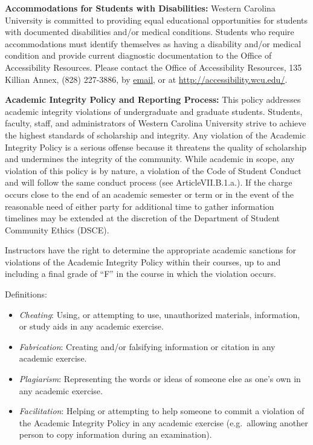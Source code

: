 \documentclass[]{tufte-book}
\providecommand{\tightlist}{%
  \setlength{\itemsep}{0pt}\setlength{\parskip}{0pt}}
\begin{document}
\textbf{Accommodations for Students with Disabilities:} Western Carolina University is committed to providing equal educational opportunities for students with documented disabilities and/or medical conditions. Students who require accommodations must identify themselves as having a disability and/or medical condition and provide current diagnostic documentation to the Office of Accessibility Resources. Please contact the Office of Accessibility Resources, 135 Killian Annex, (828) 227-3886, by \href{mailto:accessibility@wcu.edu}{email}, or at \href{https://www.wcu.edu/learn/academic-services/disability-services/index.aspx}{http://accessibility.wcu.edu/}.

\textbf{Academic Integrity Policy and Reporting Process:} This policy addresses academic integrity violations of undergraduate and graduate students. Students, faculty, staff, and administrators of Western Carolina University strive to achieve the highest standards of scholarship and integrity. Any violation of the Academic Integrity Policy is a serious offense because it threatens the quality of scholarship and undermines the integrity of the community. While academic in scope, any violation of this policy is by nature, a violation of the Code of Student Conduct and will follow the same conduct process (see ArticleVII.B.1.a.). If the charge occurs close to the end of an academic semester or term or in the event of the reasonable need of either party for additional time to gather information timelines may be extended at the discretion of the Department of Student Community Ethics (DSCE).

Instructors have the right to determine the appropriate academic sanctions for violations of the Academic Integrity Policy within their courses, up to and including a final grade of ``F'' in the course in which the violation occurs.

Definitions:

\begin{itemize}
\tightlist
\item
  \emph{Cheating}: Using, or attempting to use, unauthorized materials, information, or study aids in any academic exercise.
\item
  \emph{Fabrication}: Creating and/or falsifying information or citation in any academic exercise.
\item
  \emph{Plagiarism}: Representing the words or ideas of someone else as one's own in any academic exercise.
\item
  \emph{Facilitation}: Helping or attempting to help someone to commit a violation of the Academic Integrity Policy in any academic exercise (e.g.~allowing another person to copy information during an examination).
\end{itemize}
\end{document}
